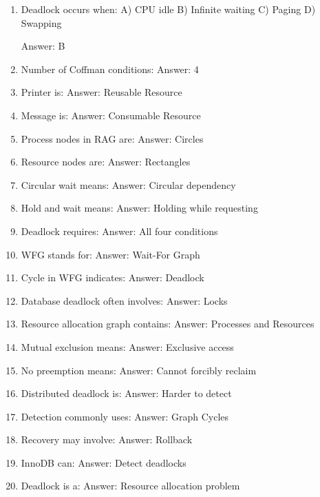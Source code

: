 \begin{enumerate}
\item Deadlock occurs when:
A) CPU idle
B) Infinite waiting
C) Paging
D) Swapping

Answer: B

\item Number of Coffman conditions:
Answer: 4

\item Printer is:
Answer: Reusable Resource

\item Message is:
Answer: Consumable Resource

\item Process nodes in RAG are:
Answer: Circles

\item Resource nodes are:
Answer: Rectangles

\item Circular wait means:
Answer: Circular dependency

\item Hold and wait means:
Answer: Holding while requesting

\item Deadlock requires:
Answer: All four conditions

\item WFG stands for:
Answer: Wait-For Graph

\item Cycle in WFG indicates:
Answer: Deadlock

\item Database deadlock often involves:
Answer: Locks

\item Resource allocation graph contains:
Answer: Processes and Resources

\item Mutual exclusion means:
Answer: Exclusive access

\item No preemption means:
Answer: Cannot forcibly reclaim

\item Distributed deadlock is:
Answer: Harder to detect

\item Detection commonly uses:
Answer: Graph Cycles

\item Recovery may involve:
Answer: Rollback

\item InnoDB can:
Answer: Detect deadlocks

\item Deadlock is a:
Answer: Resource allocation problem
\end{enumerate}

